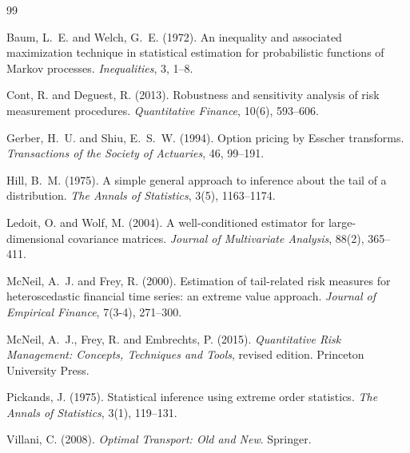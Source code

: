 \documentclass[12pt]{article}
\begin{document}

\begin{thebibliography}{99}

Baum, L.~E. and Welch, G.~E. (1972).
\newblock An inequality and associated maximization technique in statistical
  estimation for probabilistic functions of Markov processes.
\newblock \emph{Inequalities}, 3, 1--8.

Cont, R. and Deguest, R. (2013).
\newblock Robustness and sensitivity analysis of risk measurement procedures.
\newblock \emph{Quantitative Finance}, 10(6), 593--606.

Gerber, H.~U. and Shiu, E.~S.~W. (1994).
\newblock Option pricing by Esscher transforms.
\newblock \emph{Transactions of the Society of Actuaries}, 46, 99--191.

Hill, B.~M. (1975).
\newblock A simple general approach to inference about the tail of a
  distribution.
\newblock \emph{The Annals of Statistics}, 3(5), 1163--1174.

Ledoit, O. and Wolf, M. (2004).
\newblock A well-conditioned estimator for large-dimensional covariance
  matrices.
\newblock \emph{Journal of Multivariate Analysis}, 88(2), 365--411.

McNeil, A.~J. and Frey, R. (2000).
\newblock Estimation of tail-related risk measures for heteroscedastic
  financial time series: an extreme value approach.
\newblock \emph{Journal of Empirical Finance}, 7(3-4), 271--300.

McNeil, A.~J., Frey, R. and Embrechts, P. (2015).
\newblock \emph{Quantitative Risk Management: Concepts, Techniques and Tools},
  revised edition.
\newblock Princeton University Press.

Pickands, J. (1975).
\newblock Statistical inference using extreme order statistics.
\newblock \emph{The Annals of Statistics}, 3(1), 119--131.

Villani, C. (2008).
\newblock \emph{Optimal Transport: Old and New}.
\newblock Springer.

\end{thebibliography}
\end{document}
